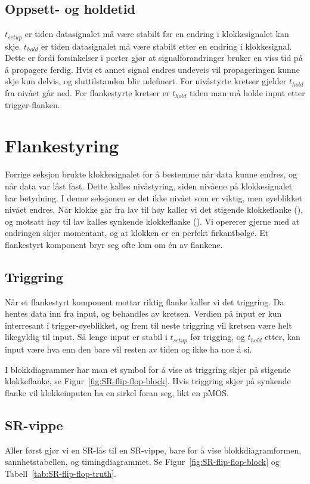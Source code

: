 \documentclass[12pt,a4paper,norsk]{article}
\newcommand{\rising}{\texttiming{[-,timing/slope=0]LH}}
\newcommand{\falling}{\texttiming{[-,timing/slope=0]HL}}
\begin{document}
\subsection{Oppsett- og holdetid}
$t_{setup}$ er tiden datasignalet må være stabilt før en endring i
klokkesignalet kan skje. $t_{hold}$ er tiden datasignalet må være stabilt etter
en endring i klokkesignal. Dette er fordi forsinkelser i porter gjør at
signalforandringer bruker en viss tid på å propagere ferdig. Hvis et annet
signal endres undeveis vil propageringen kunne skje kun delvis, og sluttilstanden
blir udefinert. For nivåstyrte kretser gjelder $t_{hold}$ fra nivået går ned.
For flankestyrte kretser er $t_{hold}$ tiden man må holde input etter
trigger-flanken.

\section{Flankestyring}
Forrige seksjon brukte klokkesignalet for å bestemme når data kunne endres, og
når data var låst fast. Dette kalles nivåstyring, siden nivåene på
klokkesignalet har betydning. I denne seksjonen er det ikke nivået som er
viktig, men øyeblikket nivået endres. Når klokke går fra lav til høy kaller vi
det stigende klokkeflanke (\rising), og motsatt høy til lav kalles synkende
klokkeflanke (\falling).
Vi opererer gjerne med at endringen skjer momentant, og at klokken er en perfekt
firkantbølge. Et flankestyrt komponent bryr seg ofte kun om én av flankene.

\subsection{Triggring}
Når et flankestyrt komponent mottar riktig flanke kaller vi det triggring. Da
hentes data inn fra input, og behandles av kretsen. Verdien på input er kun interresant i
trigger-øyeblikket, og frem til neste triggring vil kretsen være helt likegyldig
til input. Så lenge input er stabil i $t_{setup}$ før trigging, og $t_{hold}$
etter, kan input være hva enn den bare vil resten av tiden og ikke ha
noe å si.

I blokkdiagrammer har man et symbol for å vise at triggring skjer på stigende
klokkeflanke, se Figur~\ref{fig:SR-flip-flop-block}. Hvis triggring skjer på synkende
flanke vil klokkeinputen ha en sirkel foran seg, likt en pMOS\@.

\subsection{SR-vippe}
Aller først gjør vi en SR-lås til en SR-vippe, bare for å vise blokkdiagramformen,
sannhetstabellen, og timingdiagrammet. Se Figur~\ref{fig:SR-flip-flop-block} og Tabell~\ref{tab:SR-flip-flop-truth}.
\end{document}
